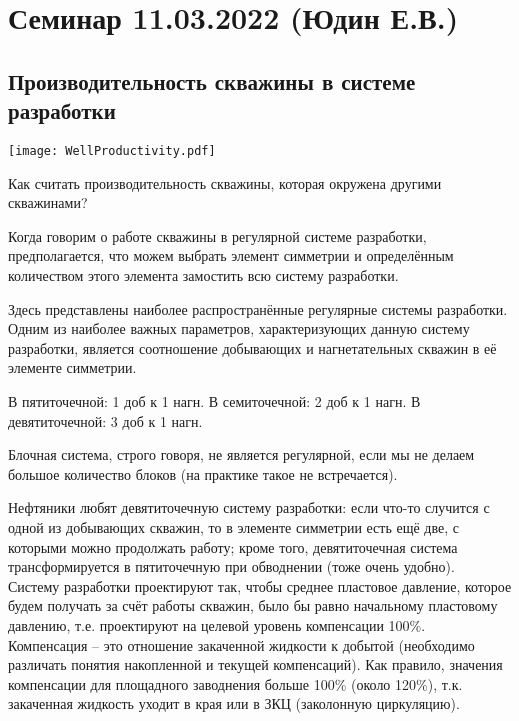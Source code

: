 \documentclass[main.tex]{subfiles}
\begin{document}
\section{Семинар 11.03.2022 (Юдин Е.В.)}

\subsection{Производительность скважины в системе разработки}

\texttt{[image: WellProductivity.pdf]}

Как считать производительность скважины, которая окружена другими скважинами?

Когда говорим о работе скважины в регулярной системе разработки, предполагается, что можем выбрать элемент симметрии и определённым количеством этого элемента замостить всю систему разработки.

Здесь представлены наиболее распространённые регулярные системы разработки. Одним из наиболее важных параметров, характеризующих данную систему разработки, является соотношение добывающих и нагнетательных скважин в её элементе симметрии.

В пятиточечной: 1 доб к 1 нагн. В семиточечной: 2 доб к 1 нагн. В девятиточечной: 3 доб к 1 нагн.

Блочная система, строго говоря, не является регулярной, если мы не делаем большое количество блоков (на практике такое не встречается).

Нефтяники любят девятиточечную систему разработки: если что-то случится с одной из добывающих скважин, то в элементе симметрии есть ещё две, с которыми можно продолжать работу; кроме того, девятиточечная система трансформируется в пятиточечную при обводнении (тоже очень удобно).\\

Систему разработки проектируют так, чтобы среднее пластовое давление, которое будем получать за счёт работы скважин, было бы равно начальному пластовому давлению, т.е. проектируют на целевой уровень компенсации 100\%.\\

Компенсация -- это отношение закаченной жидкости к добытой (необходимо различать понятия накопленной и текущей компенсаций). Как правило, значения компенсации для площадного заводнения больше 100\% (около 120\%), т.к. закаченная жидкость уходит в края или в ЗКЦ (заколонную циркуляцию).\\
\end{document}
